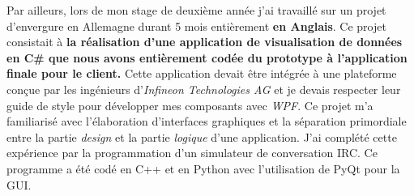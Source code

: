 Par ailleurs, lors de mon stage de deuxième année j'ai travaillé sur un projet d'envergure en Allemagne durant 5 mois entièrement \textbf{en Anglais}. Ce projet consistait à \textbf{la réalisation d'une application de visualisation de données en C\# que nous avons entièrement codée du prototype à l'application finale pour le client.} Cette application devait être intégrée à une plateforme conçue par les ingénieurs d'\textit{Infineon Technologies AG} et je devais respecter leur guide de style pour développer mes composants avec \textit{WPF}. Ce projet m'a familiarisé avec l'élaboration d'interfaces graphiques et la séparation primordiale entre la partie \textit{design} et la partie \textit{logique} d'une application. J'ai complété cette expérience par la programmation d'un simulateur de conversation IRC. Ce programme a été codé en C++ et en Python avec l'utilisation de PyQt pour la GUI. \conclude{}

\makeletterclosing

